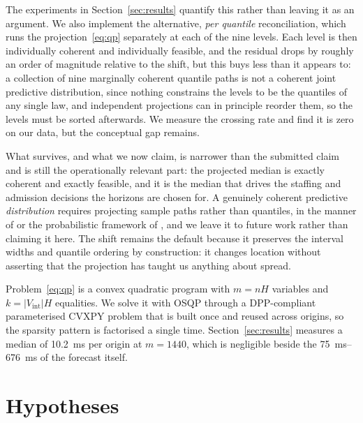\documentclass[11pt]{article}
\theoremstyle{plain}
\theoremstyle{definition}
\theoremstyle{remark}
\newif\ifrevisionmarkup
\newcommand{\new}[1]{\ifrevisionmarkup\textcolor{revision}{#1}\else#1\fi}
\begin{document}
\new{The experiments in Section~\ref{sec:results} quantify this rather than leaving it as an argument. We also implement the alternative, \emph{per quantile} reconciliation, which runs the projection~\eqref{eq:qp} separately at each of the nine levels. Each level is then individually coherent and individually feasible, and the residual drops by roughly an order of magnitude relative to the shift, but this buys less than it appears to: a collection of nine marginally coherent quantile paths is not a coherent joint predictive distribution, since nothing constrains the levels to be the quantiles of any single law, and independent projections can in principle reorder them, so the levels must be sorted afterwards. We measure the crossing rate and find it is zero on our data, but the conceptual gap remains.}

\new{What survives, and what we now claim, is narrower than the submitted claim and is still the operationally relevant part: the projected median is exactly coherent and exactly feasible, and it is the median that drives the staffing and admission decisions the horizons are chosen for. A genuinely coherent predictive \emph{distribution} requires projecting sample paths rather than quantiles, in the manner of \citet{panagiotelis2023probabilistic} or the probabilistic framework of \citet{girolimetto2023}, and we leave it to future work rather than claiming it here.} The shift remains the default because it preserves the interval widths and quantile ordering by construction: it changes location without asserting that the projection has taught us anything about spread.

Problem~\eqref{eq:qp} is a convex quadratic program with $m = nH$ variables and $k = |V_{\mathrm{int}}|H$ equalities. We solve it with OSQP \citep{osqp} through a DPP-compliant parameterised CVXPY \citep{cvxpy} problem that is built once and reused across origins, so the sparsity pattern is factorised a single time. Section~\ref{sec:results} measures a median of \SI{10.2}{\milli\second} per origin at $m=\num{1440}$, which is negligible beside the \SIrange{75}{676}{\milli\second} of the forecast itself.

\section{Hypotheses}
\label{sec:hypotheses}
\end{document}
